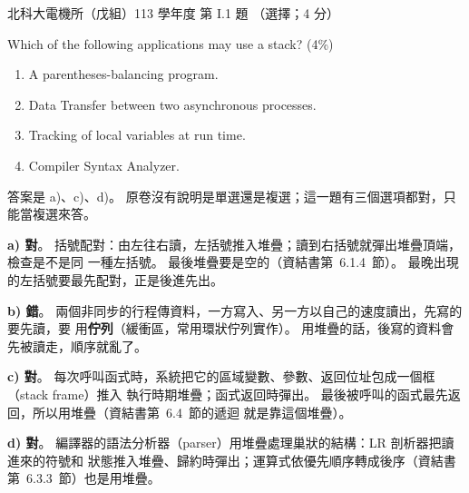 \begin{pastexam}[label={px:ntut-113-ee-ds-01}]{北科大電機所（戊組）113 學年度 第 I.1 題}
（選擇；4 分）

Which of the following applications may use a stack? (4\%)
\begin{enumerate}[label=\alph*)]
\item A parentheses-balancing program.
\item Data Transfer between two asynchronous processes.
\item Tracking of local variables at run time.
\item Compiler Syntax Analyzer.
\end{enumerate}
\end{pastexam}

\begin{pastsoln}
答案是 a)、c)、d)。 原卷沒有說明是單選還是複選；這一題有三個選項都對，只能當複選來答。

\textbf{a) 對}。 括號配對：由左往右讀，左括號推入堆疊；讀到右括號就彈出堆疊頂端，檢查是不是同
一種左括號。 最後堆疊要是空的（資結書第~6.1.4~節）。 最晚出現的左括號要最先配對，正是後進先出。

\textbf{b) 錯}。 兩個非同步的行程傳資料，一方寫入、另一方以自己的速度讀出，先寫的要先讀，要
用\textbf{佇列}（緩衝區，常用環狀佇列實作）。 用堆疊的話，後寫的資料會先被讀走，順序就亂了。

\textbf{c) 對}。 每次呼叫函式時，系統把它的區域變數、參數、返回位址包成一個框（stack frame）推入
執行時期堆疊；函式返回時彈出。 最後被呼叫的函式最先返回，所以用堆疊（資結書第~6.4~節的遞迴
就是靠這個堆疊）。

\textbf{d) 對}。 編譯器的語法分析器（parser）用堆疊處理巢狀的結構：LR 剖析器把讀進來的符號和
狀態推入堆疊、歸約時彈出；運算式依優先順序轉成後序（資結書第~6.3.3~節）也是用堆疊。
\end{pastsoln}
